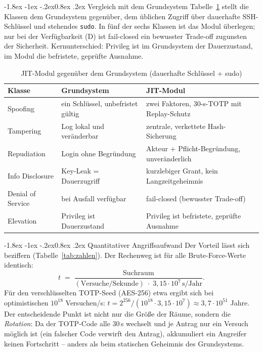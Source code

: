 \documentclass[11pt,a4paper]{article}
\makeatletter
\renewcommand\subsection{\@startsection{subsection}{2}{\z@}%
  {-1.8ex \@plus -1ex \@minus -.2ex}{0.8ex \@plus .2ex}%
  {\normalfont\large\bfseries}}
\makeatother
\begin{document}
\subsection{Vergleich mit dem Grundsystem}
Tabelle~\ref{tab:vergleich} stellt die Klassen dem Grundsystem gegenüber, dem
üblichen Zugriff über dauerhafte SSH-Schlüssel und stehendes \texttt{sudo}. In
fünf der sechs Klassen ist das Modul überlegen; nur bei der Verfügbarkeit (D)
ist fail-closed ein bewusster Trade-off zugunsten der Sicherheit. Kernunterschied:
Privileg ist im Grundsystem der Dauerzustand, im Modul die befristete, geprüfte
Ausnahme.

\begin{table}[htbp]
  \centering
  \caption{JIT-Modul gegenüber dem Grundsystem (dauerhafte Schlüssel + sudo)}
  \label{tab:vergleich}
  \small
  \renewcommand{\arraystretch}{1.25}
  \begin{tabular}{@{}p{3.3cm}p{5.0cm}p{4.9cm}@{}}
    \toprule
    \textbf{Klasse} & \textbf{Grundsystem} & \textbf{JIT-Modul} \\
    \midrule
    Spoofing          & ein Schlüssel, unbefristet gültig    & zwei Faktoren, 30-s-TOTP mit Replay-Schutz \\
    \addlinespace[4pt]
    Tampering         & Log lokal und veränderbar            & zentrale, verkettete Hash-Sicherung \\
    \addlinespace[4pt]
    Repudiation       & Login ohne Begründung                & Akteur + Pflicht-Begründung, unveränderlich \\
    \addlinespace[4pt]
    Info Disclosure   & Key-Leak = Dauerzugriff              & kurzlebiger Grant, kein Langzeitgeheimnis \\
    \addlinespace[4pt]
    Denial of Service & bei Ausfall verfügbar                & fail-closed (bewusster Trade-off) \\
    \addlinespace[4pt]
    Elevation         & Privileg ist Dauerzustand            & Privileg ist befristete, geprüfte Ausnahme \\
    \bottomrule
  \end{tabular}
\end{table}

\subsection{Quantitativer Angriffsaufwand}
Der Vorteil lässt sich beziffern (Tabelle~\ref{tab:zahlen}). Der Rechenweg ist
für alle Brute-Force-Werte identisch:
\[
  t \;=\; \frac{\mathrm{Suchraum}}{(\mathrm{Versuche/Sekunde}) \;\cdot\; 3{,}15\cdot10^{7}\,\mathrm{s/Jahr}}.
\]
Für den verschlüsselten TOTP-Seed (AES-256) etwa ergibt sich bei optimistischen
$10^{18}$ Versuchen/s: $t = 2^{256}/(10^{18}\cdot 3{,}15\cdot10^{7}) \approx
3{,}7\cdot10^{51}$ Jahre. Der entscheidende Punkt ist nicht nur die Größe der
Räume, sondern die \emph{Rotation}: Da der TOTP-Code alle 30\,s wechselt und je
Antrag nur ein Versuch möglich ist (ein falscher Code verwirft den Antrag),
akkumuliert ein Angreifer keinen Fortschritt -- anders als beim statischen
Geheimnis des Grundsystems.
\end{document}
